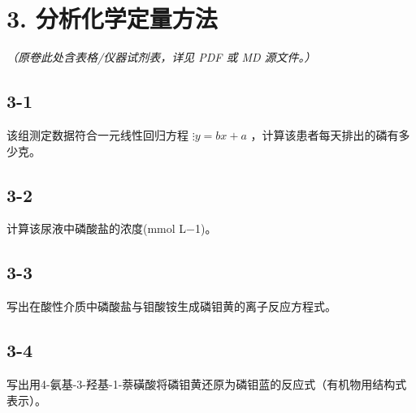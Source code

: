 \section*{3. 分析化学定量方法}
\textit{（原卷此处含表格/仪器试剂表，详见 PDF 或 MD 源文件。）}

\subsection*{3-1}
该组测定数据符合⼀元线性回归⽅程 $\vdots y = b x + a $ ，计算该患者每天排出的磷有多少克。

\subsection*{3-2}
计算该尿液中磷酸盐的浓度(mmol L−1)。

\subsection*{3-3}
写出在酸性介质中磷酸盐与钼酸铵⽣成磷钼⻩的离⼦反应⽅程式。

\subsection*{3-4}
写出⽤4-氨基-3-羟基-1-萘磺酸将磷钼⻩还原为磷钼蓝的反应式（有机物⽤结构式表⽰）。
